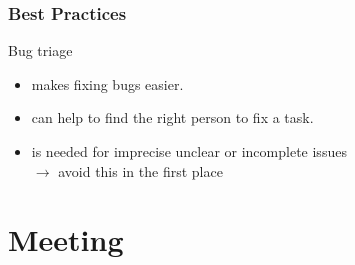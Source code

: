 \begin{frame}
	\frametitle{Best Practices}

	Bug triage
	\begin{itemize}
		\item makes fixing bugs easier.
		\item can help to find the right person to fix a task.
		\item is needed for imprecise unclear or incomplete issues \\
			$\rightarrow$ avoid this in the first place
	\end{itemize}
\end{frame}

\section{Meeting}

